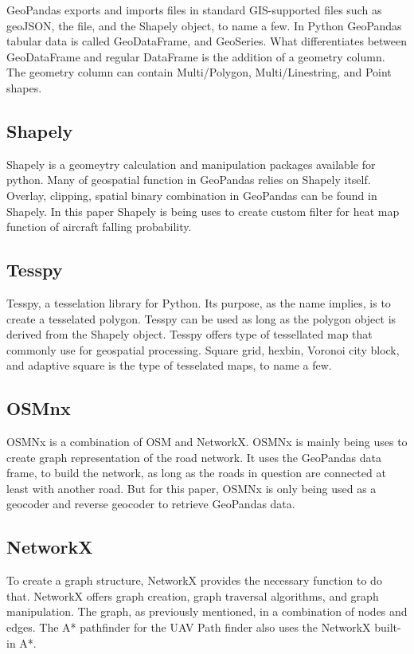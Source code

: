 \documentclass[12pt]{report}
\begin{document}
        GeoPandas exports and imports files in standard GIS-supported files such as geoJSON, the file, and the Shapely
        object, to name a few. In Python GeoPandas tabular data is called GeoDataFrame, and GeoSeries. What
        differentiates between GeoDataFrame and regular DataFrame is the addition of a geometry column. The geometry
        column can contain Multi/Polygon, Multi/Linestring, and Point shapes.

        \subsection{Shapely}
        Shapely is a geomeytry calculation and manipulation packages available for python. Many of geospatial function
        in GeoPandas relies on Shapely itself. Overlay, clipping, spatial binary combination in GeoPandas can be found
        in Shapely. In this paper Shapely is being uses to create custom filter for heat map function of aircraft
        falling probability.

        \subsection{Tesspy}
        Tesspy, a tesselation library for Python. Its purpose, as the name implies, is to create a tesselated polygon.
        Tesspy can be used as long as the polygon object is derived from the Shapely object. Tesspy offers type of
        tessellated map that commonly use for geospatial processing. Square grid, hexbin, Voronoi city block, and
        adaptive square is the type of tesselated maps, to name a few.

        \subsection{OSMnx}
        OSMNx is a combination of OSM and NetworkX. OSMNx is mainly being uses to create graph representation of the
        road network. It uses the GeoPandas data frame, to build the network, as long as the roads in question are
        connected at least with another road. But for this paper, OSMNx is only being used as a geocoder and reverse
        geocoder to retrieve GeoPandas data.

        \subsection{NetworkX}
        To create a graph structure, NetworkX provides the necessary function to do that. NetworkX offers graph
        creation, graph traversal algorithms, and graph manipulation. The graph, as previously mentioned, in a
        combination of nodes and edges. The A* pathfinder for the UAV Path finder also uses the NetworkX built-in A*.
\end{document}
